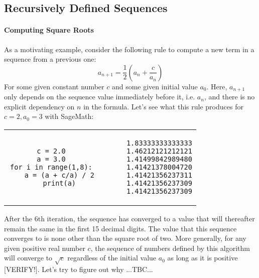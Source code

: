 \subsection{Recursively Defined Sequences}


\paragraph{Computing Square Roots}
As a motivating example, consider the following rule to compute a new term in a sequence from a previous one:
\begin{equation}
a_{n+1} = \frac{1}{2} \left( a_n + \frac{c}{a_n}  \right)
\end{equation}
For some given constant number $c$ and some given initial value $a_0$. Here, $a_{n+1}$ only depends on the sequence value immediately before it, i.e. $a_n$, and there is no explicit dependency on $n$ in the formula. Let's see what this rule produces for $c = 2, a_0 = 3$ with SageMath:
\begin{center}
\begin{tabular}{ ccccc } 
\begin{lstlisting}
c = 2.0
a = 3.0
for i in range(1,8):
    a = (a + c/a) / 2
    print(a)
\end{lstlisting}
& & & &
\begin{lstlisting}
1.83333333333333
1.46212121212121
1.41499842989480
1.41421378004720
1.41421356237311
1.41421356237309
1.41421356237309
\end{lstlisting}
\end{tabular}
\end{center}
After the 6th iteration, the sequence has converged to a value that will thereafter remain the same in the first 15 decimal digits. The value that this sequence converges to is none other than the square root of two. More generally, for any given positive real number $c$, the sequence of numbers defined by this algorithm will converge to $\sqrt{c}$ regardless of the initial value $a_0$ as long as it is positive [VERIFY!]. Let's try to figure out why ...TBC...




